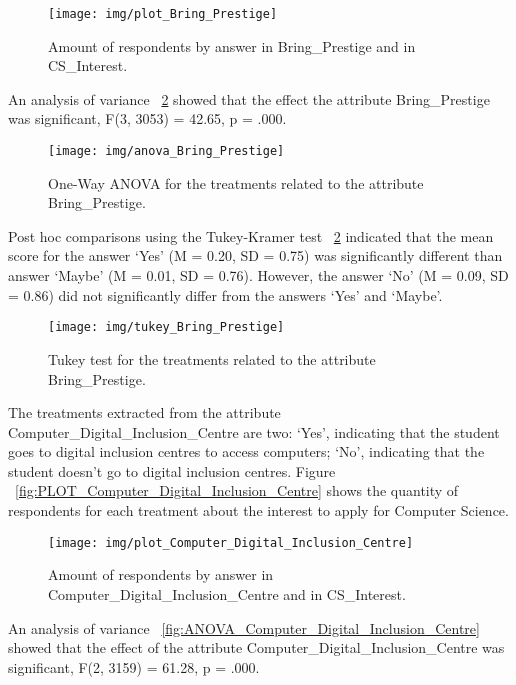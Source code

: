\begin{figure}%
\texttt{[image: img/plot\_Bring\_Prestige]}%
\caption{Amount of respondents by answer in Bring_Prestige and in CS_Interest.}%
\label{fig:plot_Bring_Prestige}%
\end{figure}%

An analysis of variance ~\ref{fig:ANOVA_Bring_Prestige} showed that the effect the attribute Bring_Prestige was significant, F(3, 3053) = 42.65, p = .000.

\begin{figure}%
\texttt{[image: img/anova\_Bring\_Prestige]}%
\caption{One-Way ANOVA for the treatments related to the attribute Bring_Prestige.}%
\label{fig:ANOVA_Bring_Prestige}%
\end{figure}%

Post hoc comparisons using the Tukey-Kramer test ~\ref{fig:ANOVA_Bring_Prestige} indicated that the mean score for the answer `Yes' (M = 0.20, SD = 0.75) was significantly different than answer `Maybe' (M = 0.01, SD = 0.76). However, the answer `No'  (M = 0.09, SD = 0.86) did not significantly differ from the answers `Yes' and `Maybe'.  

\begin{figure}%
\texttt{[image: img/tukey\_Bring\_Prestige]}%
\caption{Tukey test for the treatments related to the attribute Bring_Prestige.}%
\label{fig:TUKEY_Bring_Prestige}%
\end{figure}%

The treatments extracted from the attribute Computer_Digital_Inclusion_Centre are two: `Yes', indicating that the student goes to digital inclusion centres to access computers; `No', indicating that the student doesn't go to digital inclusion centres. Figure ~\ref{fig:PLOT_Computer_Digital_Inclusion_Centre} shows the quantity of respondents for each treatment about the interest to apply for Computer Science.

\begin{figure}%
\texttt{[image: img/plot\_Computer\_Digital\_Inclusion\_Centre]}%
\caption{Amount of respondents by answer in Computer_Digital_Inclusion_Centre and in CS_Interest.}%
\label{fig:plot_Computer_Digital_Inclusion_Centre}%
\end{figure}%

An analysis of variance ~\ref{fig:ANOVA_Computer_Digital_Inclusion_Centre} showed that the effect of the attribute Computer_Digital_Inclusion_Centre was significant, F(2, 3159) = 61.28, p = .000.

